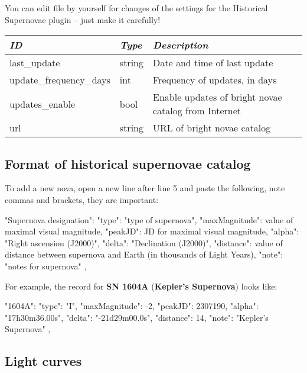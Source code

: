 You can edit  file by yourself for changes of the
settings for the Historical Supernovae plugin -- just make it carefully!

\begin{longtabu} to \textwidth {l|l|X}\toprule
\emph{ID}            & \emph{Type} & \emph{Description}\\\midrule
last\_update            & string & Date and time of last update\\\midrule
update\_frequency\_days & int    & Frequency of updates, in days\\\midrule
updates\_enable         & bool   & Enable updates of bright novae catalog from Internet \\\midrule
url                     & string & URL of bright novae catalog \\\bottomrule
\end{longtabu}

\subsection{Format of historical supernovae catalog}
\label{sec:plugins:HistoricalSupernovae:format}

To add a new nova, open a new line after line 5 and paste the following, note commas and brackets, they are important:

\begin{configfile}
"Supernova designation":
{
    "type": "type of supernova",
    "maxMagnitude": value of maximal visual magnitude,
    "peakJD": JD for maximal visual magnitude,
    "alpha": "Right ascension (J2000)",
    "delta": "Declination (J2000)",
    "distance": value of distance between supernova and 
                Earth (in thousands of Light Years),
    "note": "notes for supernova"
},
\end{configfile}

\noindent For example, the record for \textbf{SN 1604A} (\textbf{Kepler's Supernova}) looks like:
\begin{configfile}
"1604A":
{
    "type": "I",
    "maxMagnitude": -2,
    "peakJD": 2307190,
    "alpha": "17h30m36.00s",
    "delta": "-21d29m00.0s",
    "distance": 14,
    "note": "Kepler's Supernova"
},
\end{configfile}

\newpage
\subsection{Light curves}
\label{sec:plugins:HistoricalSupernovae:lightcurves}

